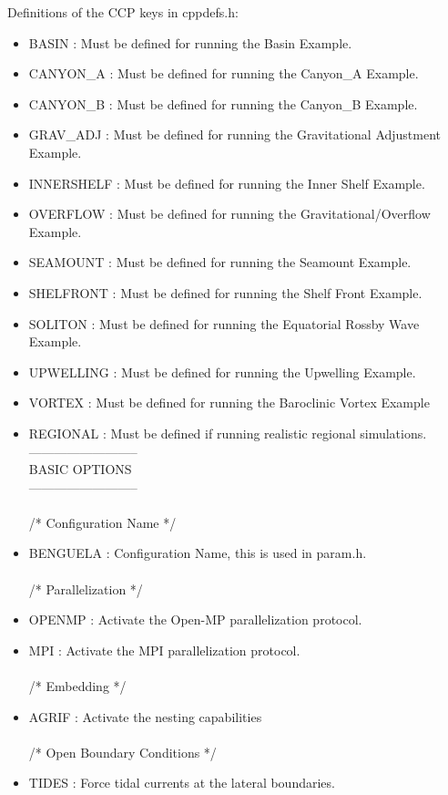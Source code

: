 Definitions of the CCP keys in cppdefs.h:
\begin{itemize}
\item BASIN     : Must be defined for running the Basin Example.
\item CANYON\_A  : Must be defined for running the Canyon\_A Example.
\item CANYON\_B  : Must be defined for running the Canyon\_B Example.
\item GRAV\_ADJ  : Must be defined for running the Gravitational Adjustment Example.
\item INNERSHELF   : Must be defined for running the Inner Shelf Example.
\item OVERFLOW  : Must be defined for running the Gravitational/Overflow Example.
\item SEAMOUNT  : Must be defined for running the Seamount Example.
\item SHELFRONT : Must be defined for running the Shelf Front Example.
\item SOLITON   : Must be defined for running the Equatorial Rossby Wave Example.
\item UPWELLING : Must be defined for running the Upwelling Example.
\item VORTEX    : Must be defined for running the Baroclinic Vortex Example  
\item REGIONAL  : Must be defined if running realistic regional simulations.
\\
--------------------------\\
       BASIC OPTIONS \\
--------------------------
\\ \\ /*                       Configuration Name */
\item BENGUELA :  Configuration Name, this is used in param.h.
\\ \\ /*                       Parallelization */
\item OPENMP : Activate the Open-MP parallelization protocol.
\item MPI : Activate the MPI parallelization protocol.
\\ \\ /*                       Embedding */
\item AGRIF : Activate the nesting capabilities
\\ \\ /*                       Open Boundary Conditions */
\item TIDES  : Force tidal currents at the lateral boundaries.

\end{itemize}
